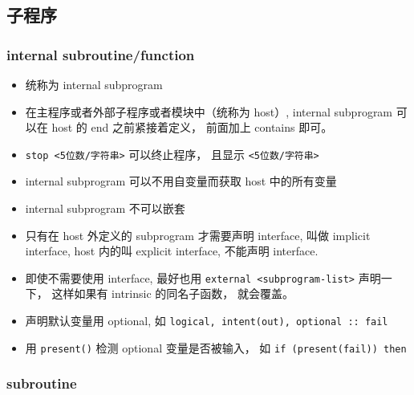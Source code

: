 \subsection{子程序}
\subsubsection{internal subroutine/function}
\begin{itemize}
\item 统称为 internal subprogram
\item 在主程序或者外部子程序或者模块中（统称为 host）, internal subprogram 可以在 host 的 end 之前紧接着定义， 前面加上 contains 即可。
\item \verb|stop <5位数/字符串>| 可以终止程序， 且显示 \verb|<5位数/字符串>|
\item internal subprogram 可以不用自变量而获取 host 中的所有变量
\item internal subprogram 不可以嵌套
\item 只有在 host 外定义的 subprogram 才需要声明 interface, 叫做 implicit interface, host 内的叫 explicit interface, 不能声明 interface.
\item 即使不需要使用 interface, 最好也用 \verb|external <subprogram-list>| 声明一下， 这样如果有 intrinsic 的同名子函数， 就会覆盖。
\item 声明默认变量用 optional, 如 \verb|logical, intent(out), optional :: fail|
\item 用 \verb|present()| 检测 optional 变量是否被输入， 如 \verb|if (present(fail)) then|
\end{itemize}

\subsubsection{subroutine}

